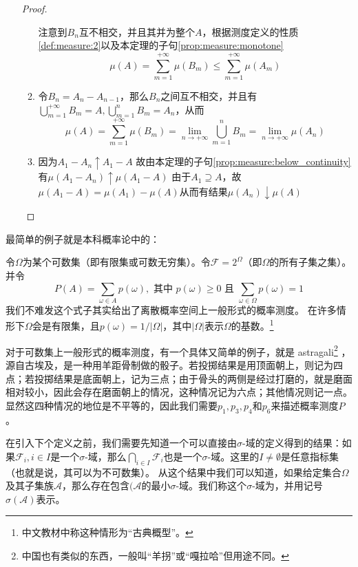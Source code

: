\documentclass[../main.tex]{subfiles}
\begin{document}
\begin{enumerate}
\begin{proof}
\begin{enumerate}
			注意到\(B_n\)互不相交，并且其并为整个\(A\)，根据测度定义的性质\ref{def:measure:2}以及本定理的子句\ref{prop:measure:monotone}
			\[\mu(A) = \sum_{m=1}^{+\infty}\mu(B_m) \leq \sum_{m=1}^{+\infty}\mu(A_m)\]
			\item 令\(B_n = A_n - A_{n-1}\)，那么\(B_n\)之间互不相交，并且有\(\bigcup_{m=1}^{+\infty} B_m = A, \bigcup_{m=1}^{n} B_m = A_n\)，从而
			\[\mu(A) = \sum_{m=1}^{+\infty}\mu(B_m) = \lim\limits_{n\rightarrow +\infty}\bigcup_{m=1}^{n} B_m = \lim\limits_{n\rightarrow +\infty}\mu(A_n)\]
			\item 因为\(A_1 - A_n \uparrow A_1 - A\) 故由本定理的子句\ref{prop:measure:below_continuity}有\(\mu(A_1 - A_n) \uparrow \mu(A_1 - A)\)
			由于\(A_1\supseteq A\)，故\(\mu(A_1 - A) = \mu(A_1) - \mu(A)\)从而有结果\(\mu(A_n)\downarrow\mu(A)\)
		\end{enumerate}
	\end{proof}
\end{enumerate}

最简单的例子就是本科概率论中的：
\begin{example}[离散概率空间] \label{ex:1.1.2} 令\(\Omega\)为某个可数集（即有限集或可数无穷集）。令\(\mathcal{F}=2^\Omega\)（即\(\Omega\)的所有子集之集）。并令
\[P(A) = \sum_{\omega \in A} p(\omega), \text{ 其中 } p(\omega) \geq 0 \text{ 且 } \sum_{\omega \in \Omega} p(\omega) = 1\]
我们不难发这个式子其实给出了离散概率空间上一般形式的概率测度。
在许多情形下\(\Omega\)会是有限集，且\(p(\omega) = 1/|\Omega|\)，其中\(|\Omega|\)表示\(\Omega\)的基数。\footnote{中文教材中称这种情形为``古典概型''。}

对于可数集上一般形式的概率测度，有一个具体又简单的例子，就是 astragali\footnote{中国也有类似的东西，一般叫``羊拐''或``嘎拉哈''但用途不同。} ，源自古埃及，是一种用羊距骨制做的骰子。若投掷结果是用顶面朝上，则记为四点；若投掷结果是底面朝上，记为三点；由于骨头的两侧是经过打磨的，就是磨面相对较小，因此会存在磨面朝上的情况，这种情况记为六点；其他情况则记一点。
显然这四种情况的地位是不平等的，因此我们需要\(p_1, p_3, p_4\)和\(p_6\)来描述概率测度\(P\)。
\end{example}

在引入下个定义之前，我们需要先知道一个可以直接由\(\sigma\)-域的定义得到的结果：如果\(\mathcal{F}_i, i\in I\)是一个\(\sigma\)-域，那么\(\bigcap_{i\in I}\mathcal{F}_i\)也是一个\(\sigma\)-域。这里的\(I \neq \emptyset\)是任意指标集（也就是说，其可以为不可数集）。
从这个结果中我们可以知道，如果给定集合\(\Omega\)及其子集族\(\mathcal{A}\)，那么存在包含\((\mathcal{A}\)的最小\(\sigma\)-域。我们称这个\(\sigma\)-域为，并用记号\(\sigma(\mathcal{A})\)表示。
\end{document}
